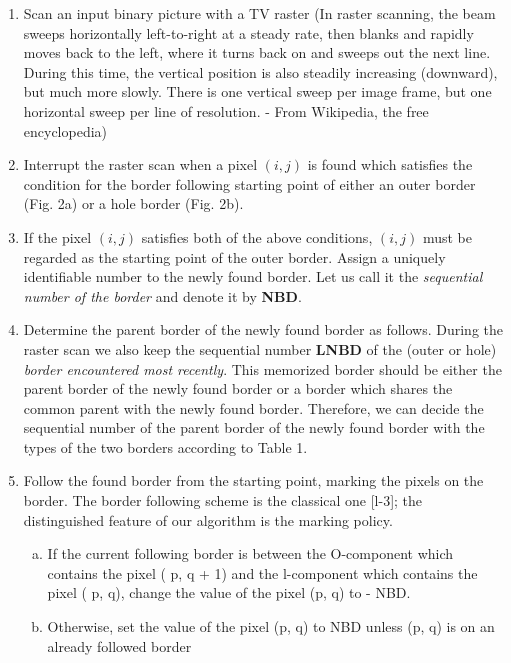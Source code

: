 \documentclass[a4paper,12pt]{book}%
\begin{document}
\begin{enumerate}
	\item Scan an input binary picture with a TV raster (In raster scanning, the beam sweeps horizontally left-to-right at a steady rate, then blanks and rapidly moves back to the left, where it turns back on and sweeps out the next line. During this time, the vertical position is also steadily increasing (downward), but much more slowly. There is one vertical sweep per image frame, but one horizontal sweep per line of resolution. - From Wikipedia, the free encyclopedia)
	
	\item Interrupt the raster scan when a pixel $(i, j)$ is found which satisfies the condition for the border following starting point of either an outer border (Fig. 2a) or a hole border (Fig. 2b).
	
	\item If the pixel $(i, j)$ satisfies both of the above conditions, $(i, j)$ must be regarded as the starting point of the outer border. Assign a uniquely identifiable number to the 	newly found border. Let us call it the \textit{sequential number of the border} and denote it by \textbf{NBD}.
	
	\item Determine the parent border of the newly found border as follows. During the	raster scan we also keep the sequential number \textbf{LNBD} of the (outer or hole) \textit{border	encountered most recently}. This memorized border should be either the parent	border of the newly found border or a border which shares the common parent with	the newly found border. Therefore, we can decide the sequential number of the	parent border of the newly found border with the types of the two borders according	to Table 1.
	
	\item Follow the found border from the starting point, marking the pixels on the border. 	The border following scheme is the classical one [l-3]; the distinguished feature of	our algorithm is the marking policy.
	
	\begin{enumerate}[(a)]
		\item If the current following border is between the O-component which contains	the pixel ( p, q + 1) and the l-component which contains the pixel ( p, q), change the	value of the pixel (p, q) to - NBD.
		
		\item Otherwise, set the value of the pixel (p, q) to NBD unless (p, q) is on an	already followed border
	\end{enumerate}
	

\end{enumerate}
\end{document}
